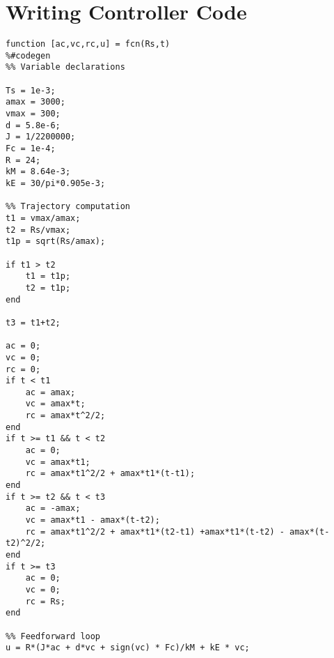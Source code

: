 \section{Writing Controller Code}
\label{appendixCode}
   
\begin{lstlisting}
function [ac,vc,rc,u] = fcn(Rs,t)
%#codegen
%% Variable declarations

Ts = 1e-3;
amax = 3000;
vmax = 300;
d = 5.8e-6;
J = 1/2200000;
Fc = 1e-4;
R = 24;
kM = 8.64e-3;
kE = 30/pi*0.905e-3;

%% Trajectory computation
t1 = vmax/amax;
t2 = Rs/vmax;
t1p = sqrt(Rs/amax);

if t1 > t2
    t1 = t1p;
    t2 = t1p;
end

t3 = t1+t2;

ac = 0;
vc = 0;
rc = 0;
if t < t1
    ac = amax;
    vc = amax*t;
    rc = amax*t^2/2;
end
if t >= t1 && t < t2
    ac = 0;
    vc = amax*t1;
    rc = amax*t1^2/2 + amax*t1*(t-t1);
end
if t >= t2 && t < t3
    ac = -amax;
    vc = amax*t1 - amax*(t-t2);
    rc = amax*t1^2/2 + amax*t1*(t2-t1) +amax*t1*(t-t2) - amax*(t-t2)^2/2;
end
if t >= t3
    ac = 0;
    vc = 0;
    rc = Rs;
end

%% Feedforward loop
u = R*(J*ac + d*vc + sign(vc) * Fc)/kM + kE * vc;

\end{lstlisting}